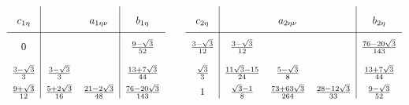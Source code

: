 \begin{eqnarray*}


\begin{array}{c|cc|c}


c_{1\eta} & & a_{1\eta\nu} & b_{1\eta}\vrule height6mm width0mm depth3mm\\


\hline


0& & & \frac{ 9-\sqrt{3}}{ 52}\vrule height6mm width0mm depth3mm \\


\frac{ 3-\sqrt{3}}{ 3} &\frac{ 3-\sqrt{3}}{ 3} & 


& \frac{ 13+ 7\sqrt{3}}{ 44}\vrule height6mm width0mm depth3mm \\


\frac{ 9+\sqrt{3}}{ 12}&\frac{ 5+2\sqrt{3}}{ 16}


& \frac{ 21-2\sqrt{3}}{ 48}


& \frac{ 76- 20\sqrt{3}}{ 143} 


\end{array}


%


\qquad


%


\begin{array}{c|ccc|c}


c_{2\eta} & & a_{2\eta\nu} & & b_{2\eta}\vrule height6mm width0mm depth3mm\\


\hline


\frac{ 3-\sqrt{3}}{ 12} & 


\frac{ 3-\sqrt{3}}{ 12}&


& & \frac{ 76-20\sqrt{3}}{ 143}\vrule height6mm width0mm depth3mm \\


\frac{ \sqrt{3}}{ 3} &


\frac{11 \sqrt{3}-15}{ 24} &


\frac{ 5-\sqrt{3}}{ 8} 


& & \frac{ 13+ 7\sqrt{3}}{ 44} \vrule height6mm width0mm depth3mm\\


1& \frac{ \sqrt{3}-1}{ 8}&


\frac{ 73+63\sqrt{3}}{ 264} & 


\frac{ 28-12\sqrt{3}}{ 33}


& \frac{ 9- \sqrt{3}}{ 52} 


\end{array}


\end{eqnarray*}


